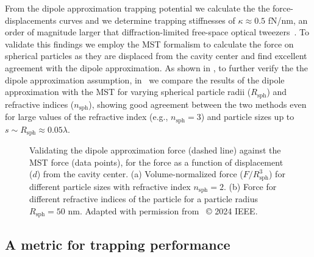 From the dipole approximation trapping potential we calculate the the force-displacements curves and we determine trapping stiffnesses
of $\kappa \approx 0.5$ fN/nm, an order of magnitude larger that diffraction-limited free-space optical tweezers~\cite{ownpub1}. To validate this findings
we employ the MST formalism to calculate the force on spherical particles as they are displaced from the cavity center and find excellent
agreement with the dipole approximation. As shown in , to further verify the the dipole approximation assumption, in~\cite{ownpub3} we compare the results of the dipole approximation with the MST
for varying spherical particle radii ($R_\text{sph}$) and refractive indices ($n_\text{sph}$), showing good agreement between the two methods
even for large values of the refractive index (e.g., $n_\text{sph}=3$) and particle sizes up to $s \sim R_\text{sph}\approx 0.05 \lambda$.
\begin{figure}[tb]
    \centering
    \caption{Validating the dipole approximation force (dashed line) against the MST force (data points), for the force as a function of displacement ($d$) from the cavity center.
    (a) Volume-normalized force ($F/R^3_\text{sph}$) for different particle sizes with refractive index $n_\text{sph}=2$. (b) Force for different refractive indices of the particle for a particle radius $R_\text{sph}=50$ nm. Adapted with permission from~\cite{ownpub3} © 2024 IEEE.}
    \label{fig:SPIE}
\end{figure}

\subsection*{A metric for trapping performance~\cite{ownpub1}}

